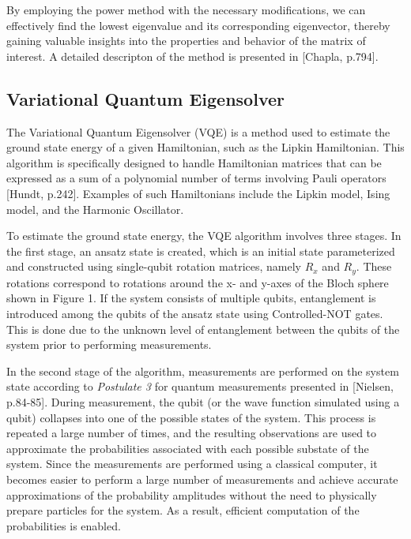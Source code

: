 \documentclass[onecolumn,10pt,cleanfoot]{asme2ej}
\begin{document}
By employing the power method with the necessary modifications, we can effectively find the lowest eigenvalue and its corresponding eigenvector, thereby gaining valuable insights into the properties and behavior of the matrix of interest. A detailed descripton of the method is presented in [Chapla, p.794].


\subsection{Variational Quantum Eigensolver}
The Variational Quantum Eigensolver (VQE) is a method used to estimate the ground state energy of a given Hamiltonian, such as the Lipkin Hamiltonian. This algorithm is specifically designed to handle Hamiltonian matrices that can be expressed as a sum of a polynomial number of terms involving Pauli operators [Hundt, p.242]. Examples of such Hamiltonians include the Lipkin model, Ising model, and the Harmonic Oscillator.

To estimate the ground state energy, the VQE algorithm involves three stages. In the first stage, an ansatz state is created, which is an initial state parameterized and constructed using single-qubit rotation matrices, namely $R_x$ and $R_y$. These rotations correspond to rotations around the x- and y-axes of the Bloch sphere shown in Figure 1. If the system consists of multiple qubits, entanglement is introduced among the qubits of the ansatz state using Controlled-NOT gates. This is done due to the unknown level of entanglement between the qubits of the system prior to performing measurements.

In the second stage of the algorithm, measurements are performed on the system state according to \textit{Postulate 3} for quantum measurements presented in [Nielsen, p.84-85]. During measurement, the qubit (or the wave function simulated using a qubit) collapses into one of the possible states of the system. This process is repeated a large number of times, and the resulting observations are used to approximate the probabilities associated with each possible substate of the system. Since the measurements are performed using a classical computer, it becomes easier to perform a large number of measurements and achieve accurate approximations of the probability amplitudes without the need to physically prepare particles for the system. As a result, efficient computation of the probabilities is enabled. 
\end{document}
